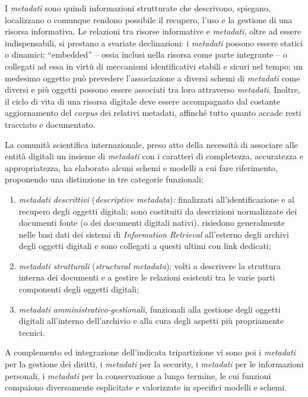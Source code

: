\documentclass[
  b5paper,
  twoside,
  11pt,
  chapterprefix=false,
  bibliography=totocnumbered,
  listof=flat]{scrbook}
\begin{document}
I \emph{metadati} sono quindi informazioni strutturate che descrivono,
spiegano, localizzano o comunque rendono possibile il recupero, l'uso e
la gestione di una risorsa informativa. Le relazioni tra risorse
informative e \emph{metadati}, oltre ad essere indispensabili, si prestano a
svariate declinazioni: i \emph{metadati} possono essere statici o dinamici;
\enquote{embedded} -- ossia inclusi nella risorsa come parte integrante -- o
collegati ad essa in virtù di meccanismi identificativi stabili e sicuri
nel tempo; un medesimo oggetto può prevedere l'associazione a diversi
schemi di \emph{metadati} come diversi e più oggetti possono essere associati
tra loro attraverso \emph{metadati}. Inoltre, il ciclo di vita di una risorsa
digitale deve essere accompagnato dal costante aggiornamento del
\emph{corpus} dei relativi metadati, affinché tutto quanto accade resti
tracciato e documentato.

La comunità scientifica internazionale, preso atto della necessità di
associare alle entità digitali un insieme di \emph{metadati} con i caratteri
di completezza, accuratezza e appropriatezza, ha elaborato alcuni schemi
e modelli a cui fare riferimento, proponendo una distinzione in tre
categorie funzionali:

\begin{enumerate}
\def\labelenumi{\arabic{enumi}.}
\item
  \emph{metadati descrittivi} (\emph{descriptive metadata})\emph{:} finalizzati
  all'identificazione e al recupero degli oggetti digitali; sono
  costituiti da descrizioni normalizzate dei documenti fonte (o dei
  documenti digitali nativi), risiedono generalmente nelle basi dati
  dei sistemi di \emph{Information Retrieval} all'esterno degli archivi
  degli oggetti digitali e sono collegati a questi ultimi con link
  dedicati;
\item
  \emph{metadati strutturali} (\emph{structural metadata}): volti a descrivere
  la struttura interna dei documenti e a gestire le relazioni
  esistenti tra le varie parti componenti degli oggetti digitali;
\item
  \emph{metadati amministrativo-gestionali}, funzionali alla gestione degli
  oggetti digitali all'interno dell'archivio e alla cura degli
  aspetti più propriamente tecnici.
\end{enumerate}

A complemento ed integrazione dell'indicata tripartizione vi sono poi i
\emph{metadati} per la gestione dei diritti, i \emph{metadati} per la security, i
\emph{metadati} per le informazioni personali, i \emph{metadati} per la
conservazione a lungo termine, le cui funzioni compaiono diversamente
esplicitate e valorizzate in specifici modelli e schemi.
\end{document}
